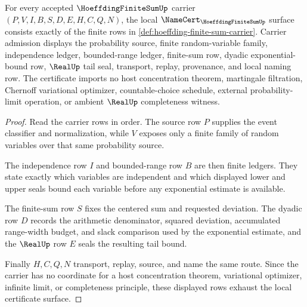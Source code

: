 \begin{theorem}\label{thm:hoeffding-finite-sum-namecert-obligations}
For every accepted $\HoeffdingFiniteSumUp$ carrier $(P,V,I,B,S,D,E,H,C,Q,N)$, the local $\NameCert_{\HoeffdingFiniteSumUp}$ surface consists exactly of the finite rows in \autoref{def:hoeffding-finite-sum-carrier}. Carrier admission displays the probability source, finite random-variable family, independence ledger, bounded-range ledger, finite-sum row, dyadic exponential-bound row, $\RealUp$ tail seal, transport, replay, provenance, and local naming row. The certificate imports no host concentration theorem, martingale filtration, Chernoff variational optimizer, countable-choice schedule, external probability-limit operation, or ambient $\RealUp$ completeness witness.
\end{theorem}
\begin{proof}
Read the carrier rows in order. The source row $P$ supplies the event classifier and normalization, while $V$ exposes only a finite family of random variables over that same probability source.

The independence row $I$ and bounded-range row $B$ are then finite ledgers. They state exactly which variables are independent and which displayed lower and upper seals bound each variable before any exponential estimate is available.

The finite-sum row $S$ fixes the centered sum and requested deviation. The dyadic row $D$ records the arithmetic denominator, squared deviation, accumulated range-width budget, and slack comparison used by the exponential estimate, and the $\RealUp$ row $E$ seals the resulting tail bound.

Finally $H,C,Q,N$ transport, replay, source, and name the same route. Since the carrier has no coordinate for a host concentration theorem, variational optimizer, infinite limit, or completeness principle, these displayed rows exhaust the local certificate surface.
\end{proof}

